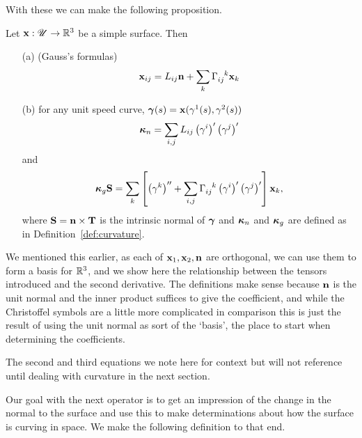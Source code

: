   
  With these we can make the following proposition.

  \begin{prop}
    Let $\mathbf{x}: \mathscr{U} \to \mathbb{R}^3$ be a simple surface. Then
    \begin{enumerate}
      \item[(a)] (Gauss's formulas)
      \begin{equation*}
        \bx_{ij} = L_{ij}\bn + \sum_k\Cfl\bx_k
      \end{equation*}
      \item[(b)] for any unit speed curve, $\boldsymbol{\gamma}(s) = \mathbf{x}(\gamma^1(s), \gamma^2(s))$
      \begin{equation*}
        \boldsymbol{\kappa}_n = \sum_{i, j} L_{ij}\left(\gamma^i\right)^\prime \left(\gamma^j\right)^\prime
      \end{equation*}
      and
      \begin{equation*}
        \label{eq:gdsc_intrinsic}
        \bk_g\bS = \sum_k\left[\left(\gamma^k\right)^{\prime\prime} + \sum_{i, j}\Cfl\left(\gamma^i\right)^\prime \left(\gamma^j\right)^\prime\right]\bx_k,
      \end{equation*}
      where $\mathbf{S} = \mathbf{n} \times \mathbf{T}$ is the intrinsic normal of $\boldsymbol{\gamma}$ and $\boldsymbol{\kappa}_n$ and $\boldsymbol{\kappa}_g$ are defined as in Definition~\ref{def:curvature}.
    \end{enumerate}
  \end{prop}

  We mentioned this earlier, as each of $\mathbf{x}_1, \mathbf{x}_2, \mathbf{n}$ are orthogonal, we can use them to form a basis for $\mathbb{R}^3$, and we show here the relationship between the tensors introduced and the second derivative. The definitions make sense because $\mathbf{n}$ is the unit normal and the inner product suffices to give the coefficient, and while the Christoffel symbols are a little more complicated in comparison this is just the result of using the unit normal as sort of the `basis', the place to start when determining the coefficients.

  The second and third equations we note here for context but will not reference until dealing with curvature in the next section.

  Our goal with the next operator is to get an impression of the change in the normal to the surface and use this to make determinations about how the surface is curving in space. We make the following definition to that end.

